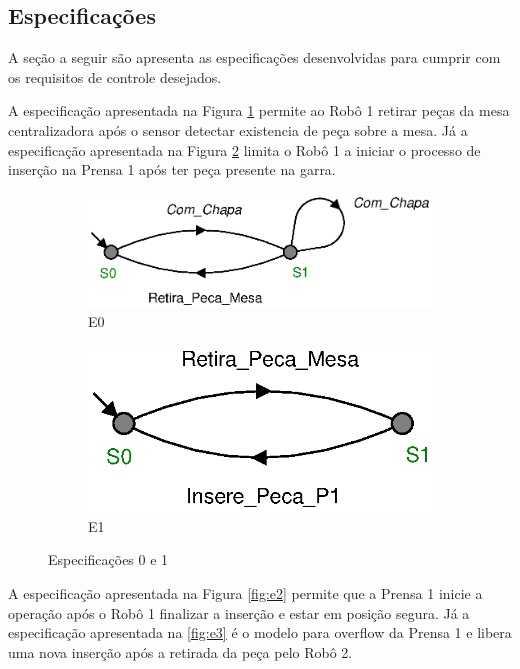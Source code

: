 \subsection{Especificações}
A seção a seguir são apresenta as especificações desenvolvidas para cumprir com os requisitos de controle desejados.

A especificação apresentada na Figura \ref{fig:e0} permite ao Robô 1 retirar peças da mesa centralizadora após o sensor detectar existencia de peça sobre a mesa.
Já a especificação apresentada na Figura \ref{fig:e1} limita o Robô 1 a iniciar o processo de inserção na Prensa 1 após ter peça presente na garra.

\begin{figure}[H]%
  \centering
  \begin{subfigure}[b]{0.45\textwidth}
      \centering
      \includegraphics[width=\textwidth]{imagens/E0.eps}
      \caption{E0}
      \label{fig:e0}
  \end{subfigure}
  \hfill
  \begin{subfigure}[b]{0.45\textwidth}
      \centering
      \includegraphics[width=\textwidth]{imagens/E1.eps}
      \caption{E1}
      \label{fig:e1}
  \end{subfigure}
  \caption{Especificações 0 e 1}
  \label{fig:e01}
\end{figure}

A especificação apresentada na Figura \ref{fig:e2} permite que a Prensa 1 inicie a operação após o Robô 1 finalizar a inserção e estar em posição segura.
Já a especificação apresentada na \ref{fig:e3} é o modelo para overflow da Prensa 1 e libera uma nova inserção após a retirada da peça pelo Robô 2.

